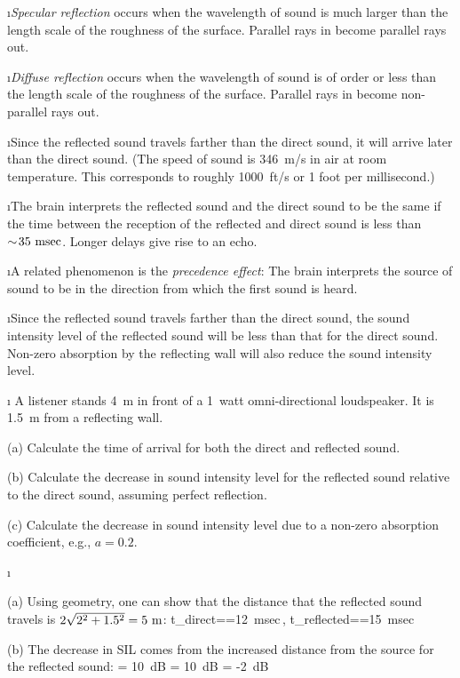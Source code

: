 \i {\em Specular reflection} occurs when the wavelength of sound 
is much larger than the length scale of the roughness of the surface.
Parallel rays in become parallel rays out.

\i {\em Diffuse reflection} occurs when the wavelength of sound
is of order or less than the length scale of the roughness of the surface.
Parallel rays in become non-parallel rays out.

\i Since the reflected sound travels farther than the 
direct sound, it will arrive later than the direct sound.
(The speed of sound is 346~m/s in air at room temperature.
This corresponds to roughly 1000~ft/s or 1 foot per millisecond.)

\i The brain interprets the reflected sound and the direct sound 
to be the same if the time between the reception of the reflected 
and direct sound is less than $\sim\!35~{\rm msec}$.
Longer delays give rise to an echo.

\i A related phenomenon is the {\em precedence effect}:
The brain interprets the source of sound to be in the direction 
from which the first sound is heard.

\i Since the reflected sound travels farther
than the direct sound, the sound intensity level of the reflected
sound will be less than that for the direct sound.
Non-zero absorption by the reflecting wall will also reduce 
the sound intensity level.

\i \exer
A listener stands 4~m in front of a 1~watt omni-directional loudspeaker.
It is 1.5~m from a reflecting wall.

(a) Calculate the time of arrival for both the 
direct and reflected sound.

(b) Calculate the decrease in sound intensity level 
for the reflected sound relative to the direct sound,
assuming perfect reflection.

(c) Calculate the decrease in sound intensity level 
due to a non-zero absorption coefficient, e.g., $a = 0.2$.

\i \ans

(a) Using geometry, one can show that the distance that the 
reflected sound travels is $2\sqrt{2^2+1.5^2}=5~{\rm m}$:
%
\be
t_{\rm direct}==12~{\rm msec}\,,
\qquad
t_{\rm reflected}==15~{\rm msec}
\ee

(b) The decrease in SIL comes from the increased distance 
from the source for the reflected sound:
%
\be
{} 
= 10~{\rm dB}
= 10\log[(4/5)^2]~{\rm dB} 
= -2~{\rm dB}
\ee

